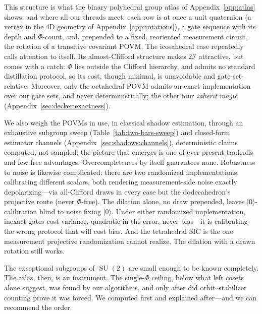 \documentclass[11pt, oneside, openany]{scrbook}
\DeclareMathOperator{\SU}{SU}
\newcommand{\Igroup}{\mathcal{I}}  %
\newcommand{\TwoI}{2\Igroup}
\newcommand{\ket}[1]{|#1\rangle}
\begin{document}
This structure is what the binary polyhedral group atlas of Appendix~\ref{app:atlas} shows, and where all our threads meet: each row is at once a unit quaternion (a vertex in the 4D geometry of Appendix~\ref{app:rotations}), a gate sequence with its depth and $\Phi$-count, and, prepended to a fixed, reoriented measurement circuit, the rotation of a transitive covariant POVM. The icosahedral case repeatedly calls attention to itself. Its almost-Clifford structure makes $\TwoI$ attractive, but comes with a catch: $\Phi$ lies outside the Clifford hierarchy, and admits no standard distillation protocol, so its cost, though minimal, is unavoidable and gate-set-relative. Moreover, only the octahedral POVM admits an exact implementation over our gate sets, and never deterministically; the other four \textit{inherit magic} (Appendix~\ref{sec:decker:exactness}).

We also weigh the POVMs in use, in classical shadow estimation, through an exhaustive subgroup sweep (Table~\ref{tab:two-bars-sweep}) and closed-form estimator channels (Appendix~\ref{sec:shadows:channels}), deterministic claims computed, not sampled; the picture that emerges is one of ever-present tradeoffs and few free advantages. Overcompleteness by itself guarantees none. Robustness to noise is likewise complicated: there are two randomized implementations, calibrating different scalars, both rendering measurement-side noise exactly depolarizing---via all-Clifford draws in every case but the dodecahedron's projective route (never $\Phi$-free). The dilation alone, no draw prepended, leaves $\ket{0}$-calibration blind to noise fixing $\ket{0}$. Under either randomized implementation, inexact gates cost variance, quadratic in the error, never bias---it is calibrating the wrong protocol that will cost bias. And the tetrahedral SIC is the one measurement projective randomization cannot realize. The dilation with a drawn rotation still works.

The exceptional subgroups of $\SU(2)$ are small enough to be known completely. The atlas, then, is an instrument. The single-$\Phi$ ceiling, below what left cosets alone suggest, was found by our algorithms, and only after did orbit--stabilizer counting prove it was forced. We computed first and explained after---and we can recommend the order.
\end{document}
